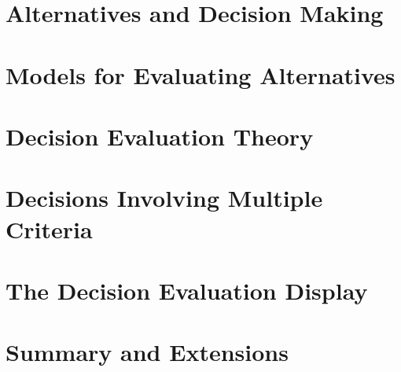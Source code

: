 

\section{Alternatives and Decision Making}


\section{Models for Evaluating Alternatives}


\section{Decision Evaluation Theory}


\section{Decisions Involving Multiple Criteria}


\section{The Decision Evaluation Display}


\section{Summary and Extensions}


